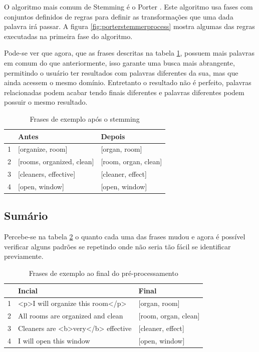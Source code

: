 O algoritmo mais comum de Stemming é o Porter \cite{porterstemming}. Este algoritmo usa fases com conjuntos definidos de regras para definir as transformações que uma dada palavra irá passar. A figura \ref{fig:porterstemmerprocess} mostra algumas das regras executadas na primeira fase do algoritmo.

Pode-se ver que agora, que as frases descritas na tabela \ref{tab:tokenfilter}, possuem mais palavras em comum do que anteriormente, isso garante uma busca mais abrangente, permitindo o usuário ter resultados com palavras diferentes da sua, mas que ainda acessem o mesmo domínio. Entretanto o resultado não é perfeito, palavras relacionadas podem acabar tendo finais diferentes e palavras diferentes podem possuir o mesmo resultado.
\begin{table}[htb]
	\centering
    \def\arraystretch{1.2}
    \begin{tabular}{|l|l|l|}
        \hline
        & \textbf{Antes} & \textbf{Depois} \\ \hline
        1 & [organize, room]  & [organ, room]            \\ \hline
        2 & [rooms, organized, clean]  & [room, organ, clean] \\ \hline
        3 & [cleaners, effective]  & [cleaner, effect]                              \\ \hline
        4 & [open, window]  & [open, window]                             \\ \hline
    \end{tabular}
	\caption{Frases de exemplo após o stemming}
    \label{tab:tokenfilter}
\end{table}

\subsection{Sumário}
Percebe-se na tabela \ref{tab:allphrases} o quanto cada uma das frases mudou e agora é possível verificar alguns padrões se repetindo onde não seria tão fácil se identificar previamente.
\begin{table}[htb]
	\centering
    \def\arraystretch{1.2} %
    \begin{tabular}{|l|l|l|}
        \hline
        & \textbf{Incial} & \textbf{Final} \\ \hline
        1 & <p>I will organize this room</p>  & [organ, room]            \\ \hline
        2 & All rooms are organized and clean  & [room, organ, clean] \\ \hline
        3 & Cleaners are <b>very</b> effective  & [cleaner, effect]                              \\ \hline
        4 & I will open this window  & [open, window]                             \\ \hline
    \end{tabular}
	\caption{Frases de exemplo ao final do pré-processamento}
    \label{tab:allphrases}
\end{table}

